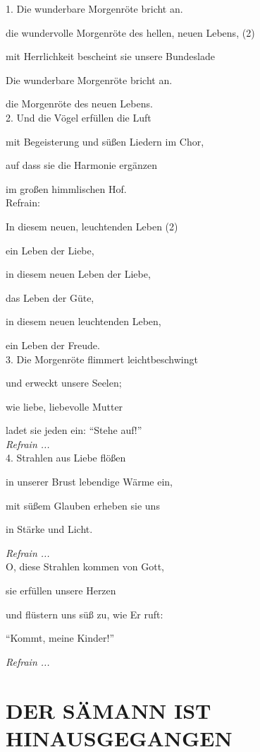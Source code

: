 \documentclass[11pt,a5paper,twoside]{article}
\begin{document}
1. Die wunderbare Morgenröte bricht an.

die wundervolle Morgenröte des hellen, neuen Lebens, (2)

mit Herrlichkeit bescheint sie unsere Bundeslade

Die wunderbare Morgenröte bricht an.

die Morgenröte des neuen Lebens.\\



2. Und die Vögel erfüllen die Luft

mit Begeisterung und süßen Liedern im Chor,

auf dass sie die Harmonie ergänzen

im großen himmlischen Hof.\\

Refrain: 

In diesem neuen, leuchtenden Leben (2)

ein Leben der Liebe,

in diesem neuen Leben der Liebe,

das Leben der Güte,

in diesem neuen leuchtenden Leben,

ein Leben der Freude.\\

3. Die Morgenröte flimmert leichtbeschwingt

und erweckt unsere Seelen;

wie liebe, liebevolle Mutter

ladet sie jeden ein: "`Stehe auf!"' \\


\textit{Refrain ...}\\

4. Strahlen aus Liebe flößen 

in unserer Brust lebendige Wärme ein,

mit süßem Glauben erheben sie uns

in Stärke und Licht.

\textit{Refrain ...}\\

O, diese Strahlen kommen von Gott,

sie erfüllen unsere Herzen

und flüstern uns süß zu, wie Er ruft:

"`Kommt, meine Kinder!"'

\textit{Refrain ...}\\


\section[Der Sämann ist hinausgegangen]{DER SÄMANN IST HINAUSGEGANGEN}
\end{document}
